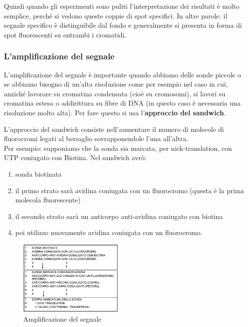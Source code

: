 \documentclass[11pt]{book}
\begin{document}
Quindi quando gli esperimenti sono puliti l’interpretazione dei risultati è molto semplice, perché si vedono queste coppie di spot specifici.
In altre parole: il segnale specifico è distinguibile dal fondo e generalmente si presenta in forma di spot fluorescenti su entrambi i cromatidi.

\subsubsection{L’amplificazione del segnale}
L’amplificazione del segnale è importante quando abbiamo delle sonde piccole o se abbiamo bisogno di un’alta risoluzione come per esempio nel caso in cui, anziché lavorare su cromatina condensata (cioè su cromosomi), si lavori su cromatina estesa o addirittura su fibre di DNA (in questo caso è necessaria una risoluzione molto alta). Per fare questo si usa l’\textbf{approccio del sandwich}.

L’approccio del sandwich consiste nell’aumentare il numero di molecole di fluorocromi legati al bersaglio sovrapponendole l'una all’altra.\\
Per esempio: supponiamo che la sonda sia marcata, per nick-translation, con UTP coniugato con Biotina. Nel sandwich avrò:
\begin{enumerate}
\item sonda biotinata
\item il primo strato sarà avidina coniugata con un fluorocromo (questa è la prima molecola fluorescente)
\item il secondo strato sarà un anticorpo anti-avidina coniugato con biotina
\item poi utilizzo nuovamente avidina coniugata con un fluorocromo.
\end{enumerate}

\begin{figure}
    \includegraphics[width=0.46\textwidth]{img/36_amplificazione_segnale_fluorescente.png}
  \caption{Amplificazione del segnale}
\end{figure}
\end{document}

